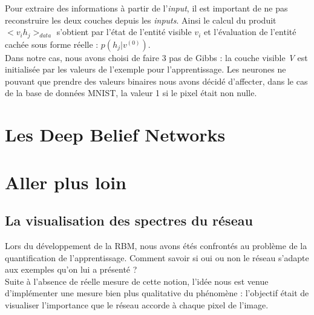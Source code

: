 \documentclass[a4paper,oneside]{report}
\begin{document}
                Pour extraire des informations à partir de l'\textit{input}, il est important de ne 
pas reconstruire les deux couches depuis les \textit{inputs}.
                Ainsi le calcul du produit \begin{math}<v_{i}h_{j}>_{data}\end{math} s'obtient par 
l'état de l'entité visible \begin{math}v_{i}\end{math} et l'évaluation de l'entité 
cachée sous forme réelle 
: \begin{math}p(h_{j}|v^{(0)})\end{math}.\\

Dans notre cas, nous avons choisi de faire 3 pas de Gibbs : la couche visible \textit{V} est initialisée par les valeurs de l'exemple pour
 l'apprentissage. Les neurones ne pouvant que prendre des valeurs binaires nous avons décidé 
d'affecter, dans le cas de la base de données MNIST, la valeur 1 si le pixel était non nulle.



                				

        \chapter{Les Deep Belief Networks}



        \chapter{Aller plus loin}

            \section{La visualisation des spectres du réseau}

                Lors du développement de la RBM, nous avons étés confrontés au problème de la 
quantification de l'apprentissage. Comment savoir si oui ou non le réseau s'adapte aux 
exemples qu'on lui a présenté ?\\

                Suite à l'absence de réelle mesure de cette notion, l'idée nous est venue 
d'implémenter une mesure bien plus qualitative du phénomène : l'objectif était de 
visualiser l'importance que le réseau 
accorde à chaque pixel de l'image.\\
\end{document}

